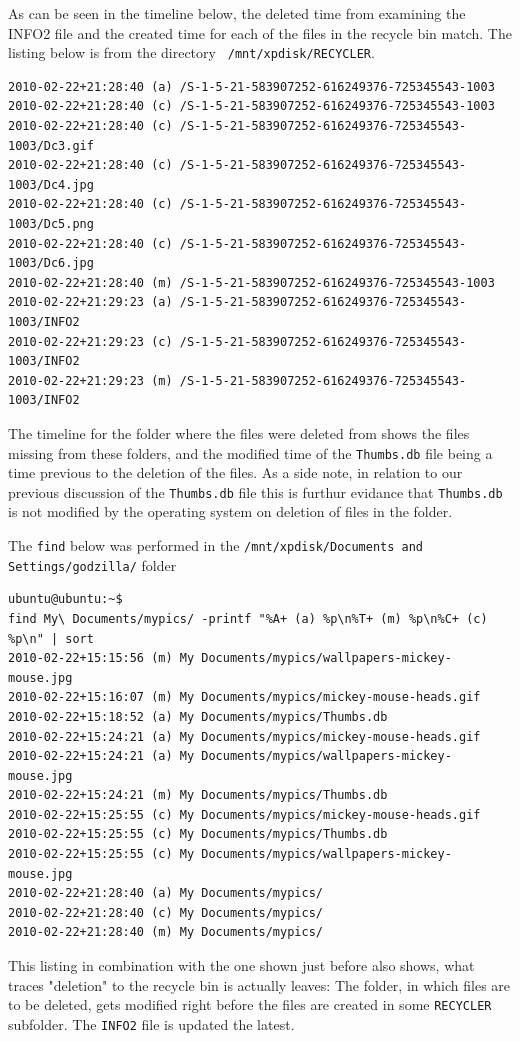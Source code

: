 \documentclass[a4paper,
    11pt,
    normalheadings,
    parindent,
    UKenglish,
    abstracton,
    ]{scrartcl}
\begin{document}
As can be seen in the timeline below, the deleted time from examining the INFO2 file and the created time for each of the files in the recycle bin match.
The listing below is from the directory \texttt{ /mnt/xpdisk/RECYCLER}.
\begin{verbatim}
2010-02-22+21:28:40 (a) /S-1-5-21-583907252-616249376-725345543-1003
2010-02-22+21:28:40 (c) /S-1-5-21-583907252-616249376-725345543-1003
2010-02-22+21:28:40 (c) /S-1-5-21-583907252-616249376-725345543-1003/Dc3.gif
2010-02-22+21:28:40 (c) /S-1-5-21-583907252-616249376-725345543-1003/Dc4.jpg
2010-02-22+21:28:40 (c) /S-1-5-21-583907252-616249376-725345543-1003/Dc5.png
2010-02-22+21:28:40 (c) /S-1-5-21-583907252-616249376-725345543-1003/Dc6.jpg
2010-02-22+21:28:40 (m) /S-1-5-21-583907252-616249376-725345543-1003
2010-02-22+21:29:23 (a) /S-1-5-21-583907252-616249376-725345543-1003/INFO2
2010-02-22+21:29:23 (c) /S-1-5-21-583907252-616249376-725345543-1003/INFO2
2010-02-22+21:29:23 (m) /S-1-5-21-583907252-616249376-725345543-1003/INFO2
\end{verbatim}

The timeline for the folder where the files were deleted from shows the files missing from these folders, and the modified time of the \texttt{Thumbs.db} file being a time previous to the deletion of the files.
As a side note, in relation to our previous discussion of the \texttt{Thumbs.db} file this is furthur evidance that \texttt{Thumbs.db} is not modified by the operating system on deletion of files in the folder.

The \texttt{find} below was performed in the \texttt{/mnt/xpdisk/Documents and Settings/godzilla/} folder
\begin{verbatim}
ubuntu@ubuntu:~$
find My\ Documents/mypics/ -printf "%A+ (a) %p\n%T+ (m) %p\n%C+ (c) %p\n" | sort
2010-02-22+15:15:56 (m) My Documents/mypics/wallpapers-mickey-mouse.jpg
2010-02-22+15:16:07 (m) My Documents/mypics/mickey-mouse-heads.gif
2010-02-22+15:18:52 (a) My Documents/mypics/Thumbs.db
2010-02-22+15:24:21 (a) My Documents/mypics/mickey-mouse-heads.gif
2010-02-22+15:24:21 (a) My Documents/mypics/wallpapers-mickey-mouse.jpg
2010-02-22+15:24:21 (m) My Documents/mypics/Thumbs.db
2010-02-22+15:25:55 (c) My Documents/mypics/mickey-mouse-heads.gif
2010-02-22+15:25:55 (c) My Documents/mypics/Thumbs.db
2010-02-22+15:25:55 (c) My Documents/mypics/wallpapers-mickey-mouse.jpg
2010-02-22+21:28:40 (a) My Documents/mypics/
2010-02-22+21:28:40 (c) My Documents/mypics/
2010-02-22+21:28:40 (m) My Documents/mypics/
\end{verbatim}
This listing in combination with the one shown just before also shows, what traces "deletion" to the recycle bin is actually leaves:
The folder, in which files are to be deleted, gets modified right before the files are created in some \texttt{RECYCLER} subfolder.
The \texttt{INFO2} file is updated the latest.
\end{document}
